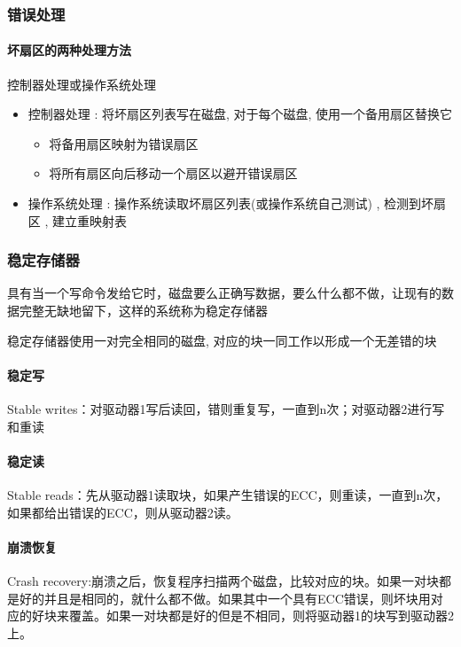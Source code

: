 \documentclass[UTF8,a4paper]{ctexart}
\begin{document}
\subsubsection{错误处理}

\paragraph{坏扇区的两种处理方法}控制器处理或操作系统处理
\begin{itemize}
	\item 控制器处理 : 将坏扇区列表写在磁盘, 对于每个磁盘, 使用一个备用扇区替换它
	\begin{itemize}
		\item 将备用扇区映射为错误扇区
		\item 将所有扇区向后移动一个扇区以避开错误扇区
	\end{itemize}
	\item 操作系统处理 : 操作系统读取坏扇区列表(或操作系统自己测试) , 检测到坏扇区 , 建立重映射表
\end{itemize}

\subsubsection{稳定存储器}
具有当一个写命令发给它时，磁盘要么正确写数据，要么什么都不做，让现有的数据完整无缺地留下，这样的系统称为稳定存储器

稳定存储器使用一对完全相同的磁盘, 对应的块一同工作以形成一个无差错的块

\paragraph{稳定写}
Stable writes：对驱动器1写后读回，错则重复写，一直到n次；对驱动器2进行写和重读

\paragraph{稳定读}Stable reads：先从驱动器1读取块，如果产生错误的ECC，则重读，一直到n次，如果都给出错误的ECC，则从驱动器2读。

\paragraph{崩溃恢复}Crash recovery:崩溃之后，恢复程序扫描两个磁盘，比较对应的块。如果一对块都是好的并且是相同的，就什么都不做。如果其中一个具有ECC错误，则坏块用对应的好块来覆盖。如果一对块都是好的但是不相同，则将驱动器1的块写到驱动器2上。
\end{document}
